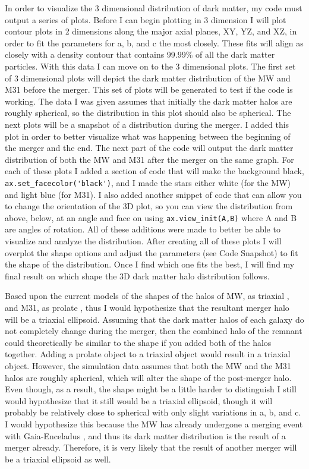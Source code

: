 \documentclass{aastex63}
\begin{document}
In order to visualize the 3 dimensional distribution of dark matter, my code must output a series of plots. Before I can begin plotting in 3 dimension I will plot contour plots in 2 dimensions along the major axial planes, XY, YZ, and XZ, in order to fit the parameters for a, b, and c the most closely. These fits will align as closely with a density contour that contains 99.99\% of all the dark matter particles. With this data I can move on to the 3 dimensional plots. The first set of 3 dimensional plots will depict the dark matter distribution of the MW and M31 before the merger. This set of plots will be generated to test if the code is working. The data I was given assumes that initially the dark matter halos are roughly spherical, so the distribution in this plot should also be spherical. The next plots will be a snapshot of a distribution during the merger. I added this plot in order to better visualize what was happening between the beginning of the merger and the end. The next part of the code will output the dark matter distribution of both the MW and M31 after the merger on the same graph. For each of these plots I added a section of code that will make the background black, \lstinline{ax.set_facecolor('black')}, and I made the stars either white (for the MW) and light blue (for M31). I also added another snippet of code that can allow you to change the orientation of the 3D plot, so you can view the distribution from above, below, at an angle and face on using \lstinline{ax.view_init(A,B)} where A and B are angles of rotation. All of these additions were made to better be able to visualize and analyze the distribution. After creating all of these plots I will overplot the shape options and adjust the parameters (see Code Snapshot) to fit the shape of the distribution. Once I find which one fits the best, I will find my final result on which shape the 3D dark matter halo distribution follows.

Based upon the current models of the shapes of the halos of MW, as triaxial \cite{Law_2010}, and M31, as prolate \cite{Hayashi_2014}, thus I would hypothesize that the resultant merger halo will be a  triaxial ellipsoid. Assuming that the dark matter halos of each galaxy do not completely change during the merger, then the combined halo of the remnant could theoretically be similar to the shape if you added both of the halos together. Adding a prolate object to a triaxial object would result in a triaxial object. However, the simulation data assumes that both the MW and the M31 halos are roughly spherical, which will alter the shape of the post-merger halo. Even though, as a result, the shape might be a little harder to distinguish I still would hypothesize that it still would be a triaxial ellipsoid, though it will probably be relatively close to spherical with only slight variations in a, b, and c. I would hypothesize this because the MW has already undergone a merging event with Gaia-Enceladus \cite{Helmi_2018}, and thus its dark matter distribution is the result of a merger already. Therefore, it is very likely that the result of another merger will be a triaxial ellipsoid as well.
\end{document}
